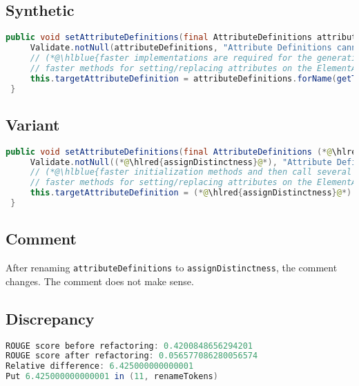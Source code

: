 \documentclass[11pt]{article}
\DeclareRobustCommand{\hlred}[1]{{\sethlcolor{YellowOrange}\hl{#1}}}
\DeclareRobustCommand{\hlblue}[1]{{\sethlcolor{SeaGreen}\hl{#1}}}
\DeclareRobustCommand{\hlblue}[1]{{\sethlcolor{SkyBlue}\hl{#1}}}
\begin{document}
\subsection{Synthetic}

\begin{lstlisting}[language=java]
 public void setAttributeDefinitions(final AttributeDefinitions attributeDefinitions) {
     Validate.notNull(attributeDefinitions, "Attribute Definitions cannot be null");
     // (*@\hlblue{faster implementations are required for the generation but cannot override or replace attributes instead of just}@*)
     // faster methods for setting/replacing attributes on the ElementAttributes implementation
     this.targetAttributeDefinition = attributeDefinitions.forName(getTemplateMode(), this.targetAttrCompleteName);
 }
\end{lstlisting}

\subsection{Variant}

\begin{lstlisting}[language=java]
 public void setAttributeDefinitions(final AttributeDefinitions (*@\hlred{assignDistinctness}@*)) {
     Validate.notNull((*@\hlred{assignDistinctness}@*), "Attribute Definitions cannot be null");
     // (*@\hlblue{faster initialization methods and then call several different and distinct values for this definition and the}@*)
     // faster methods for setting/replacing attributes on the ElementAttributes implementation
     this.targetAttributeDefinition = (*@\hlred{assignDistinctness}@*).forName(getTemplateMode(), this.targetAttrCompleteName);
 }
\end{lstlisting}
\subsection{Comment}

After renaming \texttt{attributeDefinitions} to \texttt{assignDistinctness}, the comment changes. The comment does not make sense.

\subsection{Discrepancy}

\begin{lstlisting}[language=java]
ROUGE score before refactoring: 0.4200848656294201
ROUGE score after refactoring: 0.056577086280056574
Relative difference: 6.425000000000001
Put 6.425000000000001 in (11, renameTokens)
\end{lstlisting}
\end{document}
